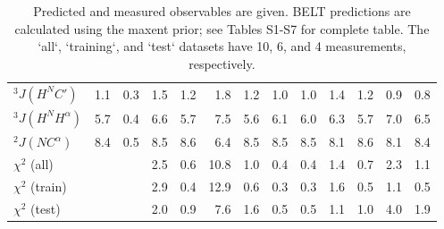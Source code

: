 \documentclass[11pt,titlepage]{article}
\begin{document}
\begin{table}
\begin{tabular}{lrrrrrrrrrrrr}
$^3J(H^NC\prime)$ &  1.1 &          0.3 &      1.5 &             1.2 &      1.8 &             1.2 &                1.0 &                       1.0 &       1.4 &              1.2 &     0.9 &            0.8 \\
$^3J(H^NH^\alpha)$     &  5.7 &          0.4 &      6.6 &             5.7 &      7.5 &             5.6 &                6.1 &                       6.0 &       6.3 &              5.7 &     7.0 &            6.5 \\
$^2J(NC^\alpha)$      &  8.4 &          0.5 &      8.5 &             8.6 &      6.4 &             8.5 &                8.5 &                       8.5 &       8.1 &              8.6 &     8.1 &            8.4 \\
$\chi^2$ (all)                           &    &            &      2.5 &             0.6 &     10.8 &             1.0 &                0.4 &                       0.4 &       1.4 &              0.7 &     2.3 &            1.1 \\
$\chi^2$ (train)                         &    &            &      2.9 &             0.4 &     12.9 &             0.6 &                0.3 &                       0.3 &       1.6 &              0.5 &     1.1 &            0.5 \\
$\chi^2$ (test)                          &    &            &      2.0 &             0.9 &      7.6 &             1.6 &                0.5 &                       0.5 &       1.1 &              1.0 &     4.0 &            1.9 \\
\bottomrule
\end{tabular}
\caption{
Predicted and measured observables are given.  BELT predictions are calculated using the maxent prior; see Tables S1-S7 for complete table.  The `all`, `training`, and `test` datasets have 10, 6, and 4 measurements, respectively.  
}
\label{table:Predictions}
\end{table}

\clearpage



\end{document}
